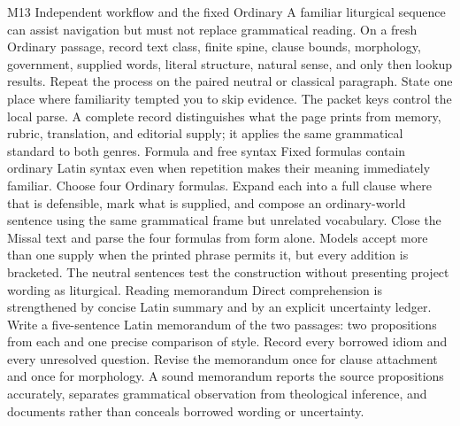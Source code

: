 \begin{courseunit}{M13}
\SubmoduleExtension
  {Independent workflow and the fixed Ordinary}
  {A familiar liturgical sequence can assist navigation but must not replace
  grammatical reading.}
  {On a fresh Ordinary passage, record text class, finite spine, clause bounds,
  morphology, government, supplied words, literal structure, natural sense,
  and only then lookup results.  Repeat the process on the paired neutral or
  classical paragraph.}
  {State one place where familiarity tempted you to skip evidence.}
  {The packet keys control the local parse.  A complete record distinguishes
  what the page prints from memory, rubric, translation, and editorial supply;
  it applies the same grammatical standard to both genres.}
\SubmoduleExtension
  {Formula and free syntax}
  {Fixed formulas contain ordinary Latin syntax even when repetition makes
  their meaning immediately familiar.}
  {Choose four Ordinary formulas.  Expand each into a full clause where that is
  defensible, mark what is supplied, and compose an ordinary-world sentence
  using the same grammatical frame but unrelated vocabulary.}
  {Close the Missal text and parse the four formulas from form alone.}
  {Models accept more than one supply when the printed phrase permits it, but
  every addition is bracketed.  The neutral sentences test the construction
  without presenting project wording as liturgical.}
\SubmoduleExtension
  {Reading memorandum}
  {Direct comprehension is strengthened by concise Latin summary and by an
  explicit uncertainty ledger.}
  {Write a five-sentence Latin memorandum of the two passages: two propositions
  from each and one precise comparison of style.  Record every borrowed idiom
  and every unresolved question.}
  {Revise the memorandum once for clause attachment and once for morphology.}
  {A sound memorandum reports the source propositions accurately, separates
  grammatical observation from theological inference, and documents rather
  than conceals borrowed wording or uncertainty.}
\end{courseunit}

